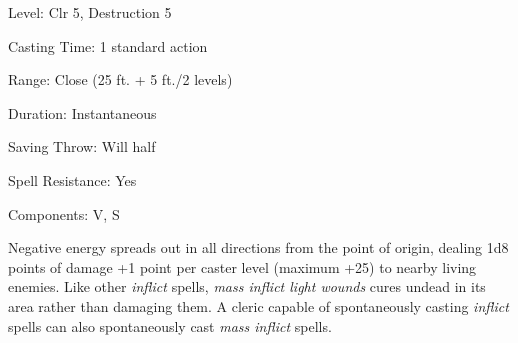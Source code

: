 
\begin{description*}
\item[Level:] Clr 5, Destruction 5
\item[Casting Time:] 1 standard action
\item[Range:] Close (25 ft. + 5 ft./2 levels)
\item[Duration:] Instantaneous
\item[Saving Throw:] Will half
\item[Spell Resistance:] Yes
\item[Components:] V, S
\end{description*}

Negative energy spreads out in all directions from the point of origin, dealing
1d8 points of damage +1 point per caster level (maximum +25) to nearby living enemies.
Like other \textit{inflict} spells, \textit{mass inflict light wounds} cures undead
in its area rather than damaging them. A cleric capable of spontaneously casting
\textit{inflict} spells can also spontaneously cast \textit{mass inflict} spells.
